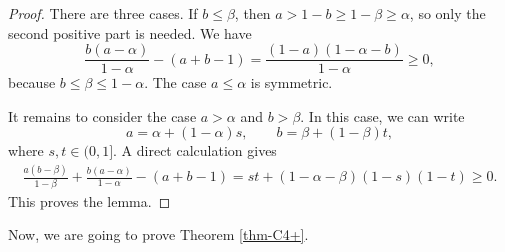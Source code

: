 \documentclass[11pt,a4paper]{article}
\theoremstyle{definition}
\theoremstyle{plain}
\renewcommand{\le}{\leqslant}
\renewcommand{\ge}{\geqslant}
\begin{document}
\begin{proof}
There are three cases.  If \(b\le \beta\), then
\(a>1-b\ge 1-\beta\ge\alpha\), so only the second positive part is needed.
We have
\[
\frac{b(a-\alpha)}{1-\alpha}-(a+b-1)
=
\frac{(1-a)(1-\alpha-b)}{1-\alpha}\ge0,
\]
because \(b\le\beta\le 1-\alpha\).  The case \(a\le\alpha\) is symmetric.

It remains to consider the case \(a>\alpha\) and \(b>\beta\).  In this case, we can write
\[
        a=\alpha+(1-\alpha)s,
        \qquad
        b=\beta+(1-\beta)t,
\]
where \(s,t\in(0,1]\).  
A direct calculation gives
\[
\begin{aligned}
\frac{a(b-\beta)}{1-\beta}
+
\frac{b(a-\alpha)}{1-\alpha}
-(a+b-1)                              =
        st+ (1-\alpha-\beta)(1-s)(1-t)\ge0.
\end{aligned}
\]
This proves the lemma.
\end{proof}


Now, we are going to prove Theorem \ref{thm-C4+}. 
\end{document}
